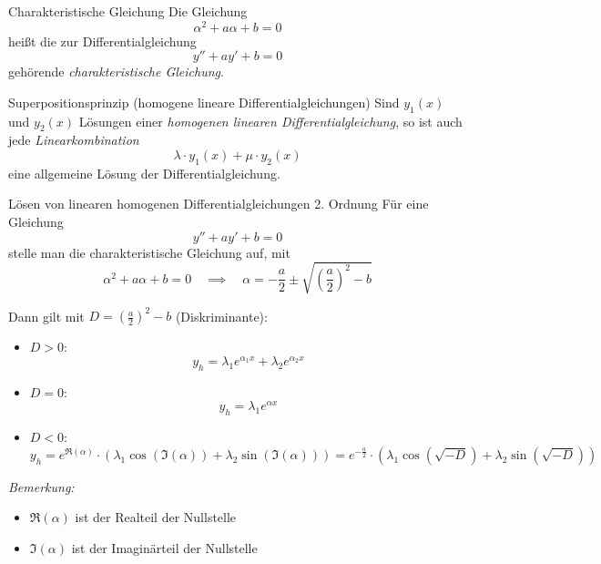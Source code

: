 \documentclass[german]{../spicker}
\begin{document}
\begin{defi}{Charakteristische Gleichung}
    Die Gleichung
    $$
        \alpha^2 + a\alpha + b = 0
    $$
    heißt die zur Differentialgleichung
    $$
        y'' + ay' + b = 0
    $$
    gehörende \emph{charakteristische Gleichung}.
\end{defi}

\begin{bonus}{Superpositionsprinzip (homogene lineare Differentialgleichungen)}
    Sind $y_1(x)$ und $y_2(x)$ Lösungen einer \emph{homogenen linearen Differentialgleichung}, so ist auch jede \emph{Linearkombination}
    $$
        \lambda\cdot  y_1(x) + \mu\cdot  y_2(x)
    $$
    eine allgemeine Lösung der Differentialgleichung.
\end{bonus}

\begin{algo}{Lösen von linearen homogenen Differentialgleichungen 2. Ordnung}
    Für eine Gleichung
    $$
        \boxed{y'' + ay' + b = 0}
    $$
    stelle man die charakteristische Gleichung auf, mit
    $$
        \alpha^2 + a\alpha + b = 0 \quad \implies \quad \alpha = -\frac{a}{2} \pm \sqrt{\left(\frac{a}{2}\right)^2 - b}
    $$

    Dann gilt mit $D = \left(\frac{a}{2}\right)^2 - b$ (Diskriminante):
    \begin{itemize}
        \item $D > 0$:
              $$
                  y_h = \lambda_1 e^{\alpha_1 x} + \lambda_2 e^{\alpha_2 x}
              $$
        \item $D = 0$:
              $$
                  y_h = \lambda_1 e^{\alpha x}
              $$
        \item $D < 0$:
              $$
                  y_h = e^{\Re(\alpha)} \cdot \left( \lambda_1 \cos(\Im(\alpha)) + \lambda_2 \sin(\Im(\alpha)) \right) = e^{-\frac{a}{2}} \cdot \left( \lambda_1 \cos(\sqrt{-D}) + \lambda_2 \sin(\sqrt{-D}) \right)
              $$
    \end{itemize}

    \emph{Bemerkung:}
    \begin{itemize}
        \item $\Re(\alpha)$ ist der Realteil der Nullstelle
        \item $\Im(\alpha)$ ist der Imaginärteil der Nullstelle
    \end{itemize}
\end{algo}
\end{document}
